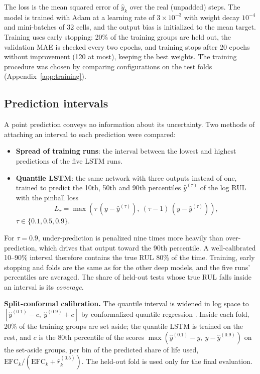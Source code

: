\documentclass[conference]{IEEEtran}
\begin{document}
The loss is the mean squared error of $\hat{y}_k$ over the real (unpadded) steps. The model is trained with Adam \cite{kingma2015} at a learning rate of $3\times10^{-3}$ with weight decay $10^{-4}$ and mini-batches of 32 cells, and the output bias is initialized to the mean target. Training uses early stopping: 20\% of the training groups are held out, the validation MAE is checked every two epochs, and training stops after 20 epochs without improvement (120 at most), keeping the best weights. The training procedure was chosen by comparing configurations on the test folds (Appendix~\ref{app:training}).

\subsection{Prediction intervals}
A point prediction conveys no information about its uncertainty. Two methods of attaching an interval to each prediction were compared:
\begin{itemize}
\item \textbf{Spread of training runs}: the interval between the lowest and highest predictions of the five LSTM runs.
\item \textbf{Quantile LSTM}: the same network with three outputs instead of one, trained to predict the 10th, 50th and 90th percentiles $\hat{y}^{(\tau)}$ of the log RUL with the pinball loss
\begin{equation}
L_\tau = \max\!\left(\tau\,(y - \hat{y}^{(\tau)}),\ (\tau - 1)\,(y - \hat{y}^{(\tau)})\right),
\end{equation}
$\tau \in \{0.1, 0.5, 0.9\}$.
\end{itemize}
For $\tau = 0.9$, under-prediction is penalized nine times more heavily than over-prediction, which drives that output toward the 90th percentile. A well-calibrated 10--90\% interval therefore contains the true RUL 80\% of the time. Training, early stopping and folds are the same as for the other deep models, and the five runs' percentiles are averaged. The share of held-out tests whose true RUL falls inside an interval is its \emph{coverage}.

\textbf{Split-conformal calibration.} The quantile interval is widened in log space to $[\hat{y}^{(0.1)}-c,\ \hat{y}^{(0.9)}+c]$ by conformalized quantile regression \cite{romano2019}. Inside each fold, 20\% of the training groups are set aside; the quantile LSTM is trained on the rest, and $c$ is the 80th percentile of the scores $\max(\hat{y}^{(0.1)}-y,\ y-\hat{y}^{(0.9)})$ on the set-aside groups, per bin of the predicted share of life used, $\mathrm{EFC}_k/(\mathrm{EFC}_k+\hat{r}^{(0.5)}_k)$. The held-out fold is used only for the final evaluation.
\end{document}
